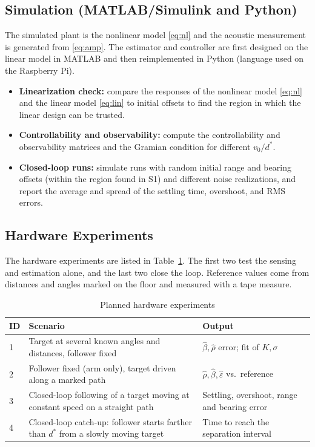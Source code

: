 \documentclass[journal,a4paper]{IEEEtran}
\begin{document}
\subsection{Simulation (MATLAB/Simulink and Python)}
The simulated plant is the nonlinear model \eqref{eq:nl} and the acoustic measurement is generated from \eqref{eq:amp}. The estimator and controller are first designed on the linear model in MATLAB and then reimplemented in Python (language used on the Raspberry Pi).
\begin{itemize}
    \item \textbf{Linearization check:} compare the responses of the nonlinear model \eqref{eq:nl} and the linear model \eqref{eq:lin} to initial offsets to find the region in which the linear design can be trusted.
    \item \textbf{Controllability and observability:} compute the controllability and observability matrices and the Gramian condition for different $v_0/d^\ast$.
    \item \textbf{Closed-loop runs:} simulate runs with random initial range and bearing offsets (within the region found in S1) and different noise realizations, and report the average and spread of the settling time, overshoot, and RMS errors.
\end{itemize}

\subsection{Hardware Experiments}
\label{sec:hardexp}
The hardware experiments are listed in Table~\ref{tab:exp}. The first two test the sensing and estimation alone, and the last two close the loop. Reference values come from distances and angles marked on the floor and measured with a tape measure.

\begin{table}[t!]
\caption{Planned hardware experiments}
\label{tab:exp}
\centering
\footnotesize
\renewcommand{\arraystretch}{1.15}
\begin{tabular}{@{}l p{3.7cm} p{2.6cm}@{}}
\toprule
ID & Scenario & Output \\
\midrule
1 & Target at several known angles and distances, follower fixed & $\hat\beta,\hat\rho$ error; fit of $K,\sigma$ \\
2 & Follower fixed (arm only), target driven along a marked path & $\hat\rho,\hat\beta,\hat\varepsilon$ vs.\ reference \\
3 & Closed-loop following of a target moving at constant speed on a straight path & Settling, overshoot, range and bearing error \\
4 & Closed-loop catch-up: follower starts farther than $d^\ast$ from a slowly moving target & Time to reach the separation interval \\
\bottomrule
\end{tabular}
\end{table}
\end{document}
